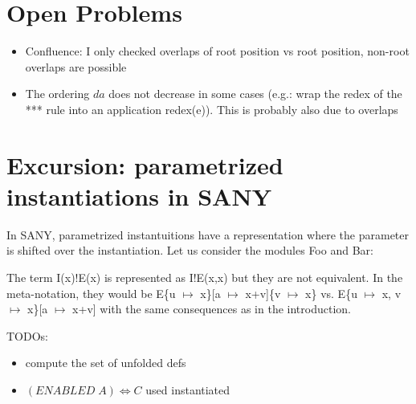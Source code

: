\documentclass[a4paper]{article}
\newcommand{\tla}[1]{#1}
\begin{document}
\section{Open Problems}
\begin{itemize}
\item Confluence: I only checked overlaps of root position vs root position,
  non-root overlaps are possible
\item The ordering $da$ does not decrease in some cases (e.g.: wrap the redex of
  the *** rule into an application redex(e)). This is probably also due to
  overlaps
\end{itemize}


\section{Excursion: parametrized instantiations in SANY}
\label{sec:param-inst}

In SANY, parametrized instantuitions have a representation where the
 parameter is shifted over the instantiation. Let us consider the
 modules Foo and Bar:

\begin{parcolumns}{2}
\end{parcolumns}

The term \tla{I(x)!E(x)} is represented as \tla{I!E(x,x)} but they are
 not equivalent. In the meta-notation, they would be
 E\{u $\mapsto$ x\}[a $\mapsto$ x+v]\{v $\mapsto$ x\} vs. E\{u $\mapsto$ x,
 v $\mapsto$ x\}[a $\mapsto$ x+v] with the same consequences as in the
 introduction.


TODOs:\\
\begin{itemize}
\item  compute the set of unfolded defs
\item  $(ENABLED\; A) \Leftrightarrow  C$ used instantiated
\end{itemize}
\end{document}
